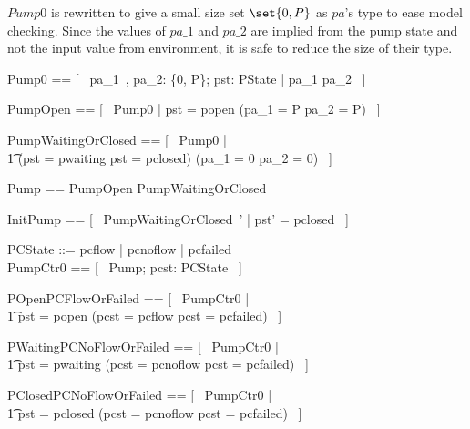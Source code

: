 \documentclass{report} %
\begin{document}
$Pump0$ is rewritten to give a small size set $\set{0, P}$ as $pa$'s type to ease model checking. Since the values of $pa\_1$ and $pa\_2$ are implied from the pump state and not the input value from environment, it is safe to reduce the size of their type.
\begin{zed}
  Pump0 == [~ pa\_1~, pa\_2: \{0, P\}; pst: PState | pa\_1 \leq pa\_2 ~]
\end{zed}

\begin{zed}
  PumpOpen == [~ Pump0 | pst = popen \implies (pa\_1 = P \land pa\_2 = P) ~]
\end{zed}

\begin{zed}
  PumpWaitingOrClosed == [~ Pump0 | \\
      \t1 (pst = pwaiting \lor pst = pclosed) \implies (pa\_1 = 0 \land pa\_2 = 0) ~]
\end{zed}

\begin{zed}
  Pump == PumpOpen \land PumpWaitingOrClosed
\end{zed}

\begin{zed}
  InitPump == [~ PumpWaitingOrClosed~' | pst' = pclosed ~]
\end{zed}

\begin{zed}
  PCState ::= pcflow | pcnoflow | pcfailed \\
  PumpCtr0 == [~ Pump; pcst: PCState ~]
\end{zed}

\begin{zed}
  POpenPCFlowOrFailed == [~ PumpCtr0 | \\
      \t1 pst = popen \implies (pcst = pcflow \lor pcst = pcfailed) ~]
\end{zed}

\begin{zed}
  PWaitingPCNoFlowOrFailed == [~ PumpCtr0 | \\
      \t1 pst = pwaiting \implies (pcst = pcnoflow \lor pcst = pcfailed) ~]
\end{zed}

\begin{zed}
  PClosedPCNoFlowOrFailed == [~ PumpCtr0 | \\
      \t1 pst = pclosed \implies (pcst = pcnoflow \lor pcst = pcfailed) ~]
\end{zed}
\end{document}
